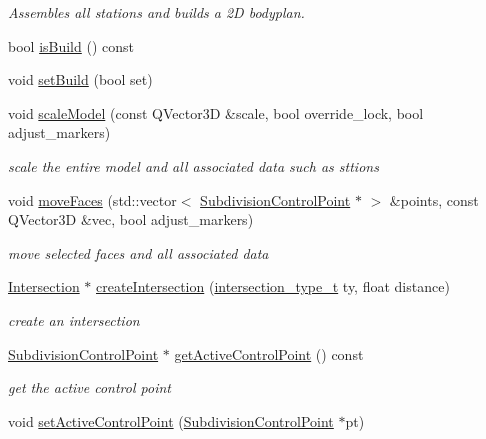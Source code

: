 \begin{DoxyCompactItemize}
\begin{DoxyCompactList}\small\item\em Assembles all stations and builds a 2D bodyplan. \end{DoxyCompactList}\item 
bool \hyperlink{classShipCAD_1_1ShipCADModel_ad2333f42cf37a754f3d29b33466e5cd2}{is\+Build} () const 
\item 
void \hyperlink{classShipCAD_1_1ShipCADModel_ab221977f2a8bd4d51d6ee777be0d7b8a}{set\+Build} (bool set)
\item 
void \hyperlink{classShipCAD_1_1ShipCADModel_a5e9e159fc6c1fcd06cc14005bb0e51c8}{scale\+Model} (const Q\+Vector3D \&scale, bool override\+\_\+lock, bool adjust\+\_\+markers)
\begin{DoxyCompactList}\small\item\em scale the entire model and all associated data such as sttions \end{DoxyCompactList}\item 
void \hyperlink{classShipCAD_1_1ShipCADModel_ac1b60be4b08de357c6a1aa0f8e1c0a9b}{move\+Faces} (std\+::vector$<$ \hyperlink{classShipCAD_1_1SubdivisionControlPoint}{Subdivision\+Control\+Point} $\ast$ $>$ \&points, const Q\+Vector3D \&vec, bool adjust\+\_\+markers)
\begin{DoxyCompactList}\small\item\em move selected faces and all associated data \end{DoxyCompactList}\item 
\hyperlink{classShipCAD_1_1Intersection}{Intersection} $\ast$ \hyperlink{classShipCAD_1_1ShipCADModel_a83e2091e476b3ea89c75ecb25f46268b}{create\+Intersection} (\hyperlink{namespaceShipCAD_aa56834b730aafdf2786ddc9a60a046fd}{intersection\+\_\+type\+\_\+t} ty, float distance)
\begin{DoxyCompactList}\small\item\em create an intersection \end{DoxyCompactList}\item 
\hyperlink{classShipCAD_1_1SubdivisionControlPoint}{Subdivision\+Control\+Point} $\ast$ \hyperlink{classShipCAD_1_1ShipCADModel_afe13cf557e067ae883433aa6f5afaf6a}{get\+Active\+Control\+Point} () const 
\begin{DoxyCompactList}\small\item\em get the active control point \end{DoxyCompactList}\item 
void \hyperlink{classShipCAD_1_1ShipCADModel_a523a7e9948d95a71e9008d386daeafee}{set\+Active\+Control\+Point} (\hyperlink{classShipCAD_1_1SubdivisionControlPoint}{Subdivision\+Control\+Point} $\ast$pt)

\end{DoxyCompactItemize}
